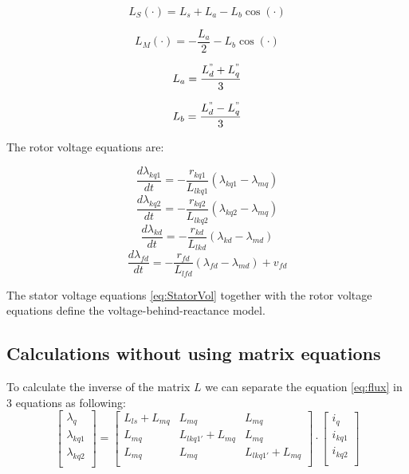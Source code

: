 \begin{equation}
L_S(\cdot) = L_s + L_a - L_b \cos (\cdot)
\end{equation}

\begin{equation}
L_M(\cdot) = - \frac{L_a}{2} - L_b \cos (\cdot)
\end{equation}

\begin{equation}
L_a = \frac{L_d^" + L_q^"}{3}
\end{equation}

\begin{equation}
L_b = \frac{L_d^" - L_q^"}{3}
\end{equation}

The rotor voltage equations are:

\begin{equation}
\frac{d \lambda_{kq1}}{dt}  = - \frac{r_{kq1}}{L_{lkq1}} (\lambda_{kq1} - \lambda_{mq})
\end{equation}
\begin{equation}
\frac{d \lambda_{kq2}}{dt}  = - \frac{r_{kq2}}{L_{lkq2}} (\lambda_{kq2} - \lambda_{mq})
\end{equation}
\begin{equation}
\frac{d \lambda_{kd}}{dt}  = - \frac{r_{kd}}{L_{lkd}} (\lambda_{kd} - \lambda_{md})
\end{equation}
\begin{equation}
\frac{d \lambda_{fd}}{dt}  = - \frac{r_{fd}}{L_{lfd}} (\lambda_{fd} - \lambda_{md}) + v_{fd}
\end{equation}

The stator voltage equations \ref{eq:StatorVol} together with the rotor voltage equations define the voltage-behind-reactance model.

\subsection{Calculations without using matrix equations}
To calculate the inverse of the matrix $L$ we can separate the equation \ref{eq:flux} in 3 equations as following:
\begin{equation}
  \begin{bmatrix}
    \lambda_{q} \\
    \lambda_{kq1} \\
    \lambda_{kq2} \\
  \end{bmatrix}
=
  \begin{bmatrix}
	L_{ls} + L_{mq} & L_{mq} & L_{mq} \\
	L_{mq} & L_{lkq1'} + L_{mq} & L_{mq} \\
	L_{mq} & L_{mq} & L_{lkq1'} + L_{mq} \\
  \end{bmatrix}
\cdot
  \begin{bmatrix}
    i_{q} \\
    i_{kq1} \\
    i_{kq2} \\
  \end{bmatrix}
\end{equation}

